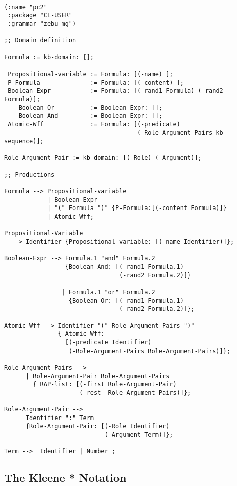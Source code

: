 {\tt \begin{verbatim}

(:name "pc2"
 :package "CL-USER"
 :grammar "zebu-mg")

;; Domain definition

Formula := kb-domain: [];

 Propositional-variable := Formula: [(-name) ];
 P-Formula              := Formula: [(-content) ];
 Boolean-Expr           := Formula: [(-rand1 Formula) (-rand2 Formula)];
    Boolean-Or          := Boolean-Expr: [];
    Boolean-And         := Boolean-Expr: [];
 Atomic-Wff             := Formula: [(-predicate)
                                     (-Role-Argument-Pairs kb-sequence)];

Role-Argument-Pair := kb-domain: [(-Role) (-Argument)];

;; Productions

Formula --> Propositional-variable
            | Boolean-Expr
            | "(" Formula ")" {P-Formula:[(-content Formula)]}
            | Atomic-Wff;  

Propositional-Variable
  --> Identifier {Propositional-variable: [(-name Identifier)]};

Boolean-Expr --> Formula.1 "and" Formula.2
                 {Boolean-And: [(-rand1 Formula.1)
                                (-rand2 Formula.2)]}

                | Formula.1 "or" Formula.2
                  {Boolean-Or: [(-rand1 Formula.1)
                                (-rand2 Formula.2)]};

Atomic-Wff --> Identifier "(" Role-Argument-Pairs ")"
               { Atomic-Wff:
                 [(-predicate Identifier)
                  (-Role-Argument-Pairs Role-Argument-Pairs)]};

Role-Argument-Pairs -->
      | Role-Argument-Pair Role-Argument-Pairs
        { RAP-list: [(-first Role-Argument-Pair)
                     (-rest  Role-Argument-Pairs)]};

Role-Argument-Pair --> 
      Identifier ":" Term
      {Role-Argument-Pair: [(-Role Identifier)
                            (-Argument Term)]};

Term -->  Identifier | Number ;
     \end{verbatim}
}

\subsection {The Kleene * Notation} 

